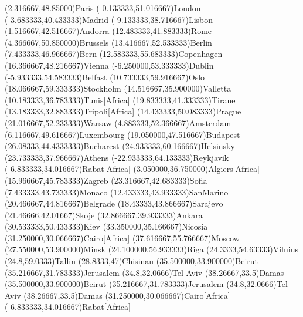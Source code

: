\mapputIIID[90](2.316667,48.85000){Paris}
\mapputIIID[90](-0.133333,51.016667){London}
\mapputIIID[90](-3.683333,40.433333){Madrid}
\mapputIIID[90](-9.133333,38.716667){Lisbon}
\mapputIIID[90](1.516667,42.516667){Andorra}
\mapputIIID[90](12.483333,41.883333){Rome}
\mapputIIID[40](4.366667,50.850000){Brussels}
\mapputIIID[90](13.416667,52.533333){Berlin}
\mapputIIID[90](7.433333,46.966667){Bern}
\mapputIIID[0](12.583333,55.683333){Copenhagen}
\mapputIIID[90](16.366667,48.216667){Vienna}
\mapputIIID[90](-6.250000,53.333333){Dublin}
\mapputIIID[90](-5.933333,54.583333){Belfast}
\mapputIIID[90](10.733333,59.916667){Oslo}
\mapputIIID[90](18.066667,59.333333){Stockholm}
\mapputIIID[90](14.516667,35.900000){Valletta}
\mapputIIID[90](10.183333,36.783333){Tunis}[Africa]
\mapputIIID[90](19.833333,41.333333){Tirane}
\mapputIIID[90](13.183333,32.883333){Tripoli}[Africa]
\mapputIIID[90](14.433333,50.083333){Prague}
\mapputIIID[90](21.016667,52.233333){Warsaw}
\mapputIIID[90](4.883333,52.366667){Amsterdam}
\mapputIIID[-60](6.116667,49.616667){Luxembourg}
\mapputIIID[0](19.050000,47.516667){Budapest}
\mapputIIID[90](26.08333,44.4333333){Bucharest}
\mapputIIID[90](24.933333,60.166667){Helsinsky}
\mapputIIID[90](23.733333,37.966667){Athens}
\mapputIIID[90](-22.933333,64.133333){Reykjavik}
\mapputIIID[90](-6.833333,34.016667){Rabat}[Africa]
\mapputIIID[90](3.050000,36.750000){Algiers}[Africa]
\mapputIIID[90](15.966667,45.783333){Zagreb}
\mapputIIID[90](23.316667,42.683333){Sofia}
\mapputIIID[90](7.433333,43.733333){Monaco}
\mapputIIID[90](12.433333,43.933333){SanMarino}
\mapputIIID[90](20.466667,44.816667){Belgrade}
\mapputIIID[90](18.43333,43.866667){Sarajevo}
\mapputIIID[90](21.46666,42.01667){Skoje}
\mapputIIID[90](32.866667,39.933333){Ankara}
\mapputIIID[90](30.533333,50.433333){Kiev}
\mapputIIID[90](33.350000,35.166667){Nicosia}
\mapputIIID[90](31.250000,30.066667){Cairo}[Africa]
\mapputIIID[90](37.616667,55.766667){Moscow}
\mapputIIID[-90](27.550000,53.900000){Minsk}
\mapputIIID[90](24.100000,56.933333){Riga}
\mapputIIID[90](24.3333,54.63333){Vilnius}
\mapputIIID[90](24.8,59.0333){Tallin}
\mapputIIID[90](28.8333,47){Chisinau}
\mapputIIID[90](35.500000,33.900000){Beirut}
\mapputIIID[0](35.216667,31.783333){Jerusalem}
\mapputIIID[180](34.8,32.0666){Tel-Aviv}
\mapputIIID[90](38.26667,33.5){Damas}
\mapputIIID[90](35.500000,33.900000){Beirut}
\mapputIIID[0](35.216667,31.783333){Jerusalem}
\mapputIIID[180](34.8,32.0666){Tel-Aviv}
\mapputIIID[90](38.26667,33.5){Damas}
\mapputIIID[90](31.250000,30.066667){Cairo}[Africa]
\mapputIIID[90](-6.833333,34.016667){Rabat}[Africa]
